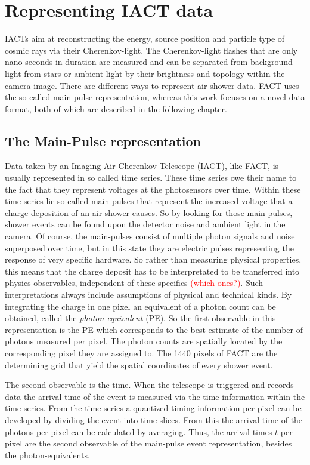 \chapter{Representing IACT data}
%
IACTs aim at reconstructing the energy, source position and particle type of
cosmic rays via their Cherenkov-light. The Cherenkov-light flashes that are
only nano seconds in duration are measured and can be separated from background
light from stars or ambient light by their brightness and topology within the
camera image. There are different ways to represent air shower data. FACT uses
the so called main-pulse representation, whereas this work focuses on a novel
data format, both of which are described in the following chapter.

\section{The Main-Pulse representation}
%
Data taken by an Imaging-Air-Cherenkov-Telescope
(IACT), like FACT, is usually represented in so called time series.
These time series owe their name to the fact that they represent voltages at the photosensors over time. Within these time series lie so called main-pulses that represent the increased voltage that a charge deposition of an air-shower causes. So by looking for those main-pulses, shower events can be found upon the detector noise and ambient light in the camera. Of course, the main-pulses consist of multiple photon signals and noise superposed over time, but in this state they are electric pulses representing the response of very specific hardware. So rather than measuring physical properties, this means that the charge deposit has to be interpretated to be transferred into physics observables, independent of these specifics \textcolor{red}{(which ones?)}. Such interpretations always include assumptions of physical and technical kinds. By integrating the charge in one pixel an equivalent of a photon count can be obtained, called the \textit{photon equivalent} (PE). So the first observable in this representation is the PE which corresponds to the best estimate of the number of photons measured per pixel. The photon counts are spatially located by the corresponding pixel they are assigned to. The 1440 pixels of FACT are the determining grid that yield the spatial coordinates of every shower event.

The second observable is the time. When the telescope is triggered and records
data the arrival time of the event is measured via the time information within
the time series. From the time series a quantized timing information per pixel
can be developed by dividing the event into time slices. From this the arrival
time of the photons per pixel can be calculated by averaging. Thus, the arrival
times $t$ per pixel are the second observable of the main-pulse event
representation, besides the photon-equivalents.

